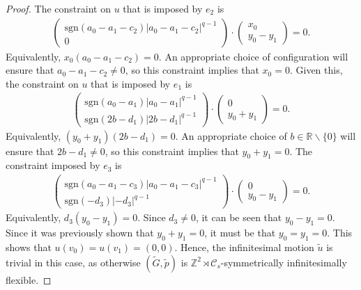 \documentclass[reqno,a4paper,10pt]{article}
\theoremstyle{definition}
\theoremstyle{remark}
\numberwithin{equation}{section}
\numberwithin{figure}{section}
\numberwithin{table}{section}
\newcommand{\R}{\mathbb{R}}
\newcommand{\Z}{\mathbb{Z}}
\newcommand{\G}{\tilde{G}}
\newcommand{\p}{\tilde{p}}
\begin{document}
\begin{proof}
        The constraint on $u$ that is imposed by $e_2$ is
		\begin{align*}
			\begin{pmatrix}
				\mathrm{sgn}(a_0-a_1-c_2)|a_0-a_1-c_2|^{q-1}\\
				0
			\end{pmatrix}
			\cdot
			\begin{pmatrix}
				x_0\\
				y_0-y_1
			\end{pmatrix}
			=0.
		\end{align*}
		Equivalently, $x_0(a_0-a_1-c_2)=0$. An appropriate choice of configuration will ensure that $a_0-a_1-c_2\neq0$, so this constraint implies that $x_0=0$. Given this, the constraint on $u$ that is imposed by $e_1$ is
		\begin{align*}
			\begin{pmatrix}
				\mathrm{sgn}(a_0-a_1)|a_0-a_1|^{q-1}\\
				\mathrm{sgn}(2b-d_1)|2b-d_1|^{q-1}
			\end{pmatrix}
			\cdot
			\begin{pmatrix}
				0\\
				y_0+y_1
			\end{pmatrix}
			=0.
		\end{align*}
		Equivalently, $(y_0+y_1)(2b-d_1)=0$. An appropriate choice of $b\in\R\backslash\{0\}$ will ensure that $2b-d_1\neq0$, so this constraint implies that $y_0+y_1=0$. The constraint imposed by $e_3$ is
		\begin{align*}
			\begin{pmatrix}
				\mathrm{sgn}(a_0-a_1-c_3)|a_0-a_1-c_3|^{q-1}\\
				\mathrm{sgn}(-d_3)|-d_3|^{q-1}
			\end{pmatrix}
			\cdot
			\begin{pmatrix}
				0\\
				y_0-y_1
			\end{pmatrix}
			=0.
		\end{align*}
		Equivalently, $d_3(y_0-y_1)=0$. Since $d_3\neq0$, it can be seen that $y_0-y_1=0$. Since it was previously shown that $y_0+y_1=0$, it must be that $y_0=y_1=0$. This shows that $u(v_0)=u(v_1)=(0,0)$. Hence, the infinitesimal motion $\tilde{u}$ is trivial in this case, as otherwise $(\G,\p)$ is $\Z^2\rtimes\mathcal{C}_s$-symmetrically infinitesimally flexible.


\end{proof}
\end{document}
